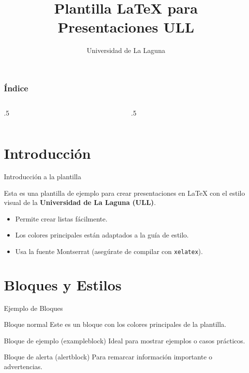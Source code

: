 \documentclass[aspectratio=169, 10pt]{beamer}
\title{Plantilla LaTeX para Presentaciones ULL}
\subtitle{Universidad de La Laguna}
\begin{document}
\begin{frame}[plain]
   \titlepage
\end{frame}

\begin{frame}[plain]
   \frametitle{Índice}
   {
      \begin{columns}[t]
         \begin{column}{.5\textwidth}
            \scriptsize
            \tableofcontents[sections={1-2}]
         \end{column}
         \begin{column}{.5\textwidth}
            \scriptsize
            \tableofcontents[sections={3-}]
         \end{column}
      \end{columns}
   }
\end{frame}

\section{Introducción}

\begin{frame}{Introducción a la plantilla}
   
   Esta es una plantilla de ejemplo para crear presentaciones en LaTeX con el estilo visual de la \textbf{Universidad de La Laguna (ULL)}.
   
   \vspace{1em}
   \begin{itemize}
       \item Permite crear listas fácilmente.
       \item Los colores principales están adaptados a la guía de estilo.
       \item Usa la fuente Montserrat (asegúrate de compilar con \texttt{xelatex}).
   \end{itemize}
\end{frame}

\section{Bloques y Estilos}

\begin{frame}{Ejemplo de Bloques}
   
   \begin{block}{Bloque normal}
       Este es un bloque con los colores principales de la plantilla.
   \end{block}
   
   \begin{exampleblock}{Bloque de ejemplo (exampleblock)}
       Ideal para mostrar ejemplos o casos prácticos.
   \end{exampleblock}
   
   \begin{alertblock}{Bloque de alerta (alertblock)}
       Para remarcar información importante o advertencias.
   \end{alertblock}
\end{frame}
\end{document}
